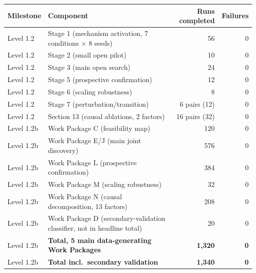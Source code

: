 \begin{tabular}{@{}llrr@{}}
\toprule
\textbf{Milestone} & \textbf{Component} & \textbf{Runs completed} & \textbf{Failures} \\
\midrule
Level 1.2  & Stage 1 (mechanism activation, 7 conditions $\times$ 8 seeds) & 56 & 0 \\
Level 1.2  & Stage 2 (small open pilot) & 10 & 0 \\
Level 1.2  & Stage 3 (main open search) & 24 & 0 \\
Level 1.2  & Stage 5 (prospective confirmation) & 12 & 0 \\
Level 1.2  & Stage 6 (scaling robustness) & 8 & 0 \\
Level 1.2  & Stage 7 (perturbation/transition) & 6 pairs (12) & 0 \\
Level 1.2  & Section 13 (causal ablations, 2 factors) & 16 pairs (32) & 0 \\
\addlinespace
Level 1.2b & Work Package C (feasibility map) & 120 & 0 \\
Level 1.2b & Work Package E/J (main joint discovery) & 576 & 0 \\
Level 1.2b & Work Package L (prospective confirmation) & 384 & 0 \\
Level 1.2b & Work Package M (scaling robustness) & 32 & 0 \\
Level 1.2b & Work Package N (causal decomposition, 13 factors) & 208 & 0 \\
Level 1.2b & Work Package D (secondary-validation classifier, not in headline total) & 20 & 0 \\
\midrule
Level 1.2b & \textbf{Total, 5 main data-generating Work Packages} & \textbf{1,320} & \textbf{0} \\
Level 1.2b & \textbf{Total incl.\ secondary validation} & \textbf{1,340} & \textbf{0} \\
\bottomrule
\end{tabular}
